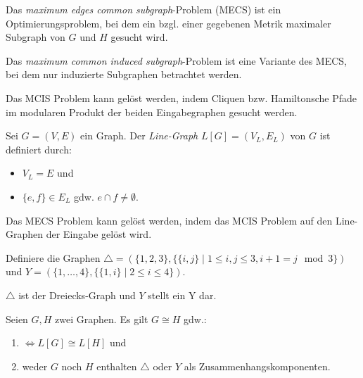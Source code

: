\begin{definition}
    Das \textit{maximum edges common subgraph}-Problem (MECS) ist ein Optimierungsproblem, bei dem ein bzgl. einer gegebenen Metrik maximaler Subgraph von $ G $ und $ H $ gesucht wird.
\end{definition}

\begin{definition}
    Das \textit{maximum common induced subgraph}-Problem ist eine Variante des MECS, bei dem nur induzierte Subgraphen betrachtet werden.
\end{definition}

\begin{remark}
    Das MCIS Problem kann gelöst werden, indem Cliquen bzw. Hamiltonsche Pfade im modularen Produkt der beiden Eingabegraphen gesucht werden.
\end{remark}

\begin{definition}
    Sei $ G = (V, E) $ ein Graph.
    Der \textit{Line-Graph} $ L[G] = (V_L, E_L) $ von $ G $ ist definiert durch:
    \begin{itemize}
        \item $ V_L = E $ und
        \item $ \{ e, f \} \in E_L $ gdw. $ e \cap f \ne \emptyset $.
    \end{itemize}
\end{definition}

\begin{remark}
    Das MECS Problem kann gelöst werden, indem das MCIS Problem auf den Line-Graphen der Eingabe gelöst wird.
\end{remark}

\begin{definition}
    Definiere die Graphen $ \triangle = (\{ 1, 2, 3 \}, \{ \{ i, j \} \mid 1 \leq i, j \leq 3, i + 1 = j \mod 3 \}) $ und $ Y = (\{ 1, \dots, 4 \}, \{ \{ 1, i \} \mid 2 \leq i \leq 4 \}) $.
\end{definition}

\begin{remark}
    $ \triangle $ ist der Dreiecks-Graph und $ Y $ stellt ein Y dar.
\end{remark}

\begin{theorem}
    Seien $ G, H $ zwei Graphen.
    Es gilt $ G \cong H $ gdw.:
    \begin{enumerate}
        \item $ \Leftrightarrow L[G] \cong L[H] $ und
        \item weder $ G $ noch $ H $ enthalten $ \triangle $ oder $ Y $ als Zusammenhangskomponenten.
    \end{enumerate}
\end{theorem}
